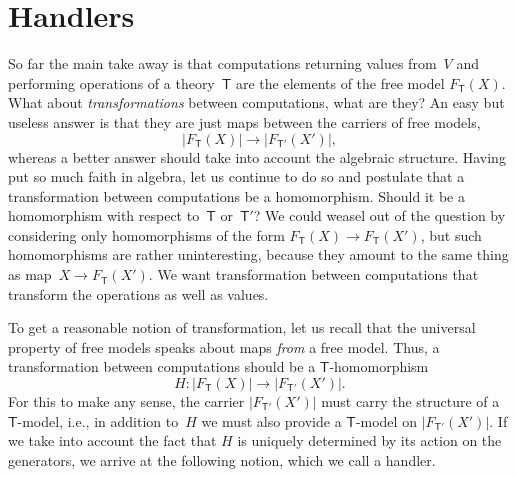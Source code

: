 \documentclass{amsart}
\newcommand{\theory}[1]{\mathsf{#1}} %
\newcommand{\carrier}[1]{|#1|} %
\newcommand{\Free}[2]{F_{\theory{#1}}(#2)} %
\begin{document}
\section{Handlers}
\label{sec:handlers}

So far the main take away is that computations returning values from~$V$ and
performing operations of a theory~$\theory{T}$ are the elements of the free
model $\Free{T}{X}$. What about \emph{transformations} between computations,
what are they? An easy but useless answer is that they are just maps between the
carriers of free models,
%
\begin{equation*}
  \carrier{\Free{T}{X}} \longrightarrow \carrier{\Free{T'}{X'}},
\end{equation*}
%
whereas a better answer should take into account the algebraic structure. Having
put so much faith in algebra, let us continue to do so and postulate that a
transformation between computations be a homomorphism. Should it be a
homomorphism with respect to~$\theory{T}$ or~$\theory{T}'$? We could weasel out
of the question by considering only homomorphisms of the form
$\Free{T}{X} \to \Free{T}{X'}$, but such homomorphisms are rather uninteresting,
because they amount to the same thing as map~$X \to \Free{T}{X'}$. We want
transformation between computations that transform the operations as well as
values.

To get a reasonable notion of transformation, let us recall that the universal
property of free models speaks about maps \emph{from} a free model. Thus, a
transformation between computations should be a $\theory{T}$-homomorphism
%
\begin{equation*}
  H : \carrier{\Free{T}{X}} \longrightarrow \carrier{\Free{T'}{X'}}.
\end{equation*}
%
For this to make any sense, the carrier $\carrier{\Free{T'}{X'}}$ must carry the
structure of a $\theory{T}$-model, i.e., in addition to~$H$ we must also
provide a $\theory{T}$-model on $\carrier{\Free{T'}{X'}}$. If we take into account the
fact that $H$ is uniquely determined by its action on the generators, we
arrive at the following notion, which we call a handler.
\end{document}
